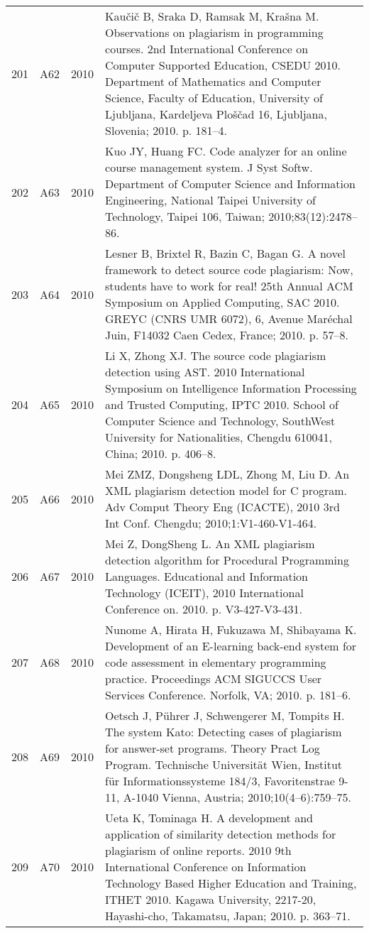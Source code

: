 \documentclass{article}\usepackage[]{graphicx}\usepackage[]{color}
\begin{document}
\begin{longtable}{l|L{1cm}|L{1cm}|L{12cm}|}
  201 & A62 & 2010 & Kaučič B, Sraka D, Ramsak M, Krašna M. Observations on plagiarism in programming courses. 2nd International Conference on Computer Supported Education, CSEDU 2010. Department of Mathematics and Computer Science, Faculty of Education, University of Ljubljana, Kardeljeva Ploščad 16, Ljubljana, Slovenia; 2010. p. 181–4. \\ 
  202 & A63 & 2010 & Kuo JY, Huang FC. Code analyzer for an online course management system. J Syst Softw. Department of Computer Science and Information Engineering, National Taipei University of Technology, Taipei 106, Taiwan; 2010;83(12):2478–86. \\ 
  203 & A64 & 2010 & Lesner B, Brixtel R, Bazin C, Bagan G. A novel framework to detect source code plagiarism: Now, students have to work for real! 25th Annual ACM Symposium on Applied Computing, SAC 2010. GREYC (CNRS UMR 6072), 6, Avenue Maréchal Juin, F14032 Caen Cedex, France; 2010. p. 57–8. \\ 
  204 & A65 & 2010 & Li X, Zhong XJ. The source code plagiarism detection using AST. 2010 International Symposium on Intelligence Information Processing and Trusted Computing, IPTC 2010. School of Computer Science and Technology, SouthWest University for Nationalities, Chengdu 610041, China; 2010. p. 406–8. \\ 
  205 & A66 & 2010 & Mei ZMZ, Dongsheng LDL, Zhong M, Liu D. An XML plagiarism detection model for C program. Adv Comput Theory Eng (ICACTE), 2010 3rd Int Conf. Chengdu; 2010;1:V1-460-V1-464. \\ 
  206 & A67 & 2010 & Mei Z, DongSheng L. An XML plagiarism detection algorithm for Procedural Programming Languages. Educational and Information Technology (ICEIT), 2010 International Conference on. 2010. p. V3-427-V3-431. \\ 
  207 & A68 & 2010 & Nunome A, Hirata H, Fukuzawa M, Shibayama K. Development of an E-learning back-end system for code assessment in elementary programming practice. Proceedings ACM SIGUCCS User Services Conference. Norfolk, VA; 2010. p. 181–6. \\ 
  208 & A69 & 2010 & Oetsch J, Pührer J, Schwengerer M, Tompits H. The system Kato: Detecting cases of plagiarism for answer-set programs. Theory Pract Log Program. Technische Universität Wien, Institut für Informationssysteme 184/3, Favoritenstrae 9-11, A-1040 Vienna, Austria; 2010;10(4–6):759–75. \\ 
  209 & A70 & 2010 & Ueta K, Tominaga H. A development and application of similarity detection methods for plagiarism of online reports. 2010 9th International Conference on Information Technology Based Higher Education and Training, ITHET 2010. Kagawa University, 2217-20, Hayashi-cho, Takamatsu, Japan; 2010. p. 363–71. \\ 

\end{longtable}
\end{document}
